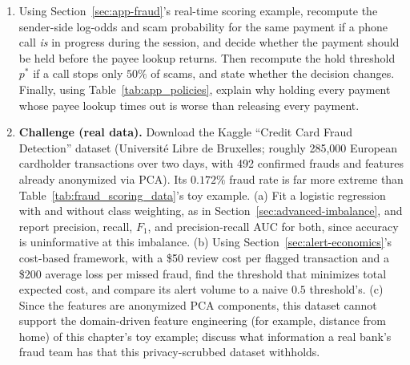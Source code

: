 \documentclass[../ai_in_finance]{subfiles}
\begin{document}
\begin{enumerate}[exercises]
    \item Using Section~\ref{sec:app-fraud}'s real-time scoring example, recompute the sender-side log-odds and scam probability for the same payment if a phone call \emph{is} in progress during the session, and decide whether the payment should be held before the payee lookup returns. Then recompute the hold threshold $p^{*}$ if a call stops only $50\%$ of scams, and state whether the decision changes. Finally, using Table~\ref{tab:app_policies}, explain why holding every payment whose payee lookup times out is worse than releasing every payment.
    \item \textbf{Challenge (real data).} Download the Kaggle ``Credit Card Fraud Detection'' dataset (Universit\'e Libre de Bruxelles; roughly 285,000 European cardholder transactions over two days, with 492 confirmed frauds and features already anonymized via PCA). Its $0.172\%$ fraud rate is far more extreme than Table~\ref{tab:fraud_scoring_data}'s toy example. (a) Fit a logistic regression with and without class weighting, as in Section~\ref{sec:advanced-imbalance}, and report precision, recall, $F_1$, and precision-recall AUC for both, since accuracy is uninformative at this imbalance. (b) Using Section~\ref{sec:alert-economics}'s cost-based framework, with a \$50 review cost per flagged transaction and a \$200 average loss per missed fraud, find the threshold that minimizes total expected cost, and compare its alert volume to a naive $0.5$ threshold's. (c) Since the features are anonymized PCA components, this dataset cannot support the domain-driven feature engineering (for example, distance from home) of this chapter's toy example; discuss what information a real bank's fraud team has that this privacy-scrubbed dataset withholds.
\end{enumerate}

\end{document}
